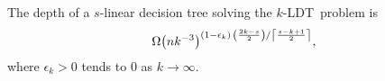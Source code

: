 \begin{theorem}
The depth of a $s$-linear decision tree solving the \(k\)-LDT\ problem is
\begin{displaymath}
{\Omega\mleft(nk^{-3}\mright)}^{
	(1-\epsilon_k)
	\,
	{\left(\frac{2k-s}{2}\right)}
	/
	{\left\lceil\frac{s-k+1}{2}\right\rceil}
},
\end{displaymath}
where \(\epsilon_k > 0\) tends to \(0\) as \(k \to\infty\).
\end{theorem}
